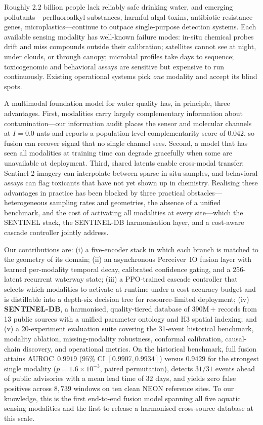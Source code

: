 \documentclass{article}
\begin{document}
Roughly 2.2 billion people lack reliably safe drinking water, and emerging pollutants---per\-fluoro\-alkyl substances, harmful algal toxins, antibiotic-resistance genes, microplastics---continue to outpace single-purpose detection systems. Each available sensing modality has well-known failure modes: in-situ chemical probes drift and miss compounds outside their calibration; satellites cannot see at night, under clouds, or through canopy; microbial profiles take days to sequence; toxicogenomic and behavioral assays are sensitive but expensive to run continuously. Existing operational systems pick \emph{one} modality and accept its blind spots.

A multimodal foundation model for water quality has, in principle, three advantages. First, modalities carry largely complementary information about contamination---our information audit places the sensor and molecular channels at $I\!=\!0.0$ nats and reports a population-level complementarity score of $0.042$, so fusion can recover signal that no single channel sees. Second, a model that has seen all modalities at training time can degrade gracefully when some are unavailable at deployment. Third, shared latents enable cross-modal transfer: Sentinel-2 imagery can interpolate between sparse in-situ samples, and behavioral assays can flag toxicants that have not yet shown up in chemistry. Realising these advantages in practice has been blocked by three practical obstacles---heterogeneous sampling rates and geometries, the absence of a unified benchmark, and the cost of activating all modalities at every site---which the SENTINEL stack, the SENTINEL-DB harmonisation layer, and a cost-aware cascade controller jointly address.

Our contributions are: (i) a five-encoder stack in which each branch is matched to the geometry of its domain; (ii) an asynchronous Perceiver~IO fusion layer with learned per-modality temporal decay, calibrated confidence gating, and a $256$-latent recurrent waterway state; (iii) a PPO-trained cascade controller that selects which modalities to activate at runtime under a cost-accuracy budget and is distillable into a depth-six decision tree for resource-limited deployment; (iv) \textbf{SENTINEL-DB}, a harmonised, quality-tiered database of $390$M\,+ records from 13 public sources with a unified parameter ontology and H3 spatial indexing; and (v) a 20-experiment evaluation suite covering the 31-event historical benchmark, modality ablation, missing-modality robustness, conformal calibration, causal-chain discovery, and operational metrics. On the historical benchmark, full fusion attains AUROC~$0.9919$ ($95\%$ CI $[0.9907,0.9934]$) versus $0.9429$ for the strongest single modality ($p\!=\!1.6\!\times\!10^{-3}$, paired permutation), detects $31/31$ events ahead of public advisories with a mean lead time of $32$ days, and yields zero false positives across $8{,}739$ windows on ten clean NEON reference sites. To our knowledge, this is the first end-to-end fusion model spanning all five aquatic sensing modalities and the first to release a harmonised cross-source database at this scale.
\end{document}
